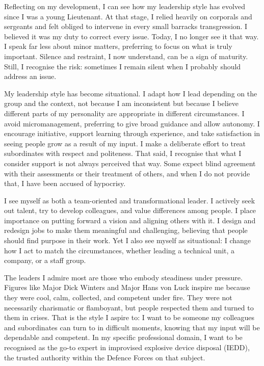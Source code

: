 Reflecting on my development, I can see how my leadership style has evolved since I was a young Lieutenant. At that stage, I relied heavily on corporals and sergeants and felt obliged to intervene in every small barracks transgression. I believed it was my duty to correct every issue. Today, I no longer see it that way. I speak far less about minor matters, preferring to focus on what is truly important. Silence and restraint, I now understand, can be a sign of maturity. Still, I recognise the risk: sometimes I remain silent when I probably should address an issue.

My leadership style has become situational. I adapt how I lead depending on the group and the context, not because I am inconsistent but because I believe different parts of my personality are appropriate in different circumstances. I avoid micromanagement, preferring to give broad guidance and allow autonomy. I encourage initiative, support learning through experience, and take satisfaction in seeing people grow as a result of my input. I make a deliberate effort to treat subordinates with respect and politeness. That said, I recognise that what I consider support is not always perceived that way. Some expect blind agreement with their assessments or their treatment of others, and when I do not provide that, I have been accused of hypocrisy.

I see myself as both a team-oriented and transformational leader. I actively seek out talent, try to develop colleagues, and value differences among people. I place importance on putting forward a vision and aligning others with it. I design and redesign jobs to make them meaningful and challenging, believing that people should find purpose in their work. Yet I also see myself as situational: I change how I act to match the circumstances, whether leading a technical unit, a company, or a staff group.

The leaders I admire most are those who embody steadiness under pressure. Figures like Major Dick Winters and Major Hans von Luck inspire me because they were cool, calm, collected, and competent under fire. They were not necessarily charismatic or flamboyant, but people respected them and turned to them in crises. That is the style I aspire to: I want to be someone my colleagues and subordinates can turn to in difficult moments, knowing that my input will be dependable and competent. In my specific professional domain, I want to be recognised as the go-to expert in improvised explosive device disposal (IEDD), the trusted authority within the Defence Forces on that subject.

